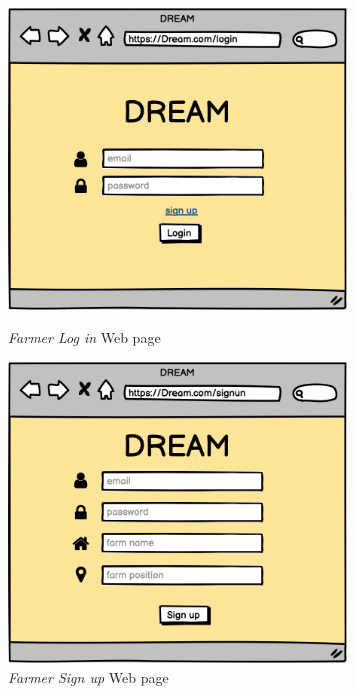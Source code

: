 \begin{figure}[ht!]
    \begin{minipage}{0.5\textwidth}
        \centering
        \includegraphics[width=0.8\textwidth]{mocups/FLogIn.png}
        \caption{\emph{Farmer Log in} Web page}
        \label{fig:mockupLogin}
    \end{minipage}\hfill
    \begin{minipage}{0.5\textwidth}
        \centering
        \includegraphics[width=0.8\textwidth]{mocups/SignUp.png}
        \caption{\emph{Farmer Sign up} Web page}
        \label{fig:smockupSignUp}
    \end{minipage}
\end{figure}

